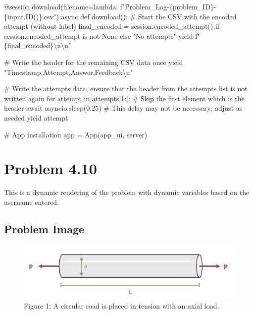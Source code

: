 \documentclass[
  letterpaper,
  DIV=11,
  numbers=noendperiod]{scrreprt}
\newenvironment{Shaded}{\begin{snugshade}}{\end{snugshade}}
\newcommand{\NormalTok}[1]{\textcolor[rgb]{0.00,0.23,0.31}{#1}}
\begin{document}
\begin{Shaded}
\begin{Highlighting}[]
\NormalTok{    @session.download(filename=lambda: f"Problem\_Log{-}\{problem\_ID\}{-}\{input.ID()\}.csv")}
\NormalTok{    async def download():}
\NormalTok{        \# Start the CSV with the encoded attempt (without label)}
\NormalTok{        final\_encoded = session.encoded\_attempt() if session.encoded\_attempt is not None else "No attempts"}
\NormalTok{        yield f"\{final\_encoded\}\textbackslash{}n\textbackslash{}n"}
        
\NormalTok{        \# Write the header for the remaining CSV data once}
\NormalTok{        yield "Timestamp,Attempt,Answer,Feedback\textbackslash{}n"}
        
\NormalTok{        \# Write the attempts data, ensure that the header from the attempts list is not written again}
\NormalTok{        for attempt in attempts[1:]:  \# Skip the first element which is the header}
\NormalTok{            await asyncio.sleep(0.25)  \# This delay may not be necessary; adjust as needed}
\NormalTok{            yield attempt}


\NormalTok{\# App installation}
\NormalTok{app = App(app\_ui, server)}
\end{Highlighting}
\end{Shaded}

\chapter*{Problem 4.10}\label{problem-4.10}


This is a dynamic rendering of the problem with dynamic variables based
on the username entered.

\section*{Problem Image}\label{problem-image-25}


\begin{figure}[H]

{\centering \includegraphics{images/206.png}

}

\caption{Figure 1: A circular road is placed in tension with an axial
load.}

\end{figure}%
\end{document}
